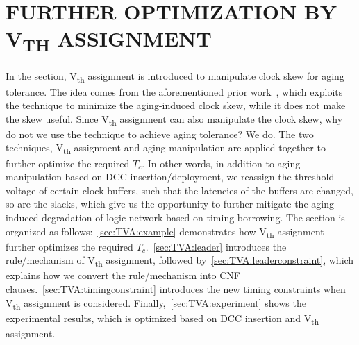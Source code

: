  \section{FURTHER OPTIMIZATION BY V\textsubscript{TH} ASSIGNMENT}
\label{sec:TVA}
In the section, V\textsubscript{th} assignment is introduced to manipulate clock skew for aging tolerance. The idea comes from the aforementioned prior work~\cite{chen2013novel}, which exploits the technique to minimize the aging-induced clock skew, while it does not make the skew useful. Since V\textsubscript{th} assignment can also manipulate the clock skew, why do not we use the technique to achieve aging tolerance? We do. The two techniques,  V\textsubscript{th} assignment and aging manipulation are applied together to further optimize the required $T_c$. In other words, in addition to aging manipulation based on DCC insertion/deployment, we reassign the threshold voltage of certain clock buffers, such that the latencies of the buffers are changed, so are the slacks, which give us the opportunity to further mitigate the aging-induced degradation of logic network based on timing borrowing. The section is organized as follows:~\ref{sec:TVA:example} demonstrates how V\textsubscript{th} assignment further optimizes the required $T_c$.~\ref{sec:TVA:leader} introduces the rule/mechanism of V\textsubscript{th} assignment, followed by~\ref{sec:TVA:leaderconstraint}, which explains how we convert the rule/mechanism into CNF clauses.~\ref{sec:TVA:timingconstraint} introduces the new timing constraints when V\textsubscript{th} assignment is considered. Finally,~\ref{sec:TVA:experiment} shows the experimental results, which is optimized based on DCC insertion and V\textsubscript{th} assignment.

